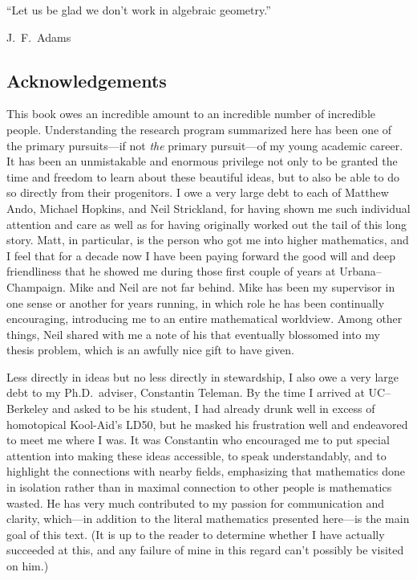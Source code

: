 
% 

\newpage

\vspace*{\fill}

\epigraph{``Let us be glad we don't work in algebraic geometry.''}{J.\ F.\ Adams~\cite[Section 2.1]{AdamsInfiniteLoopSpaces}}

\newpage

\subsection*{Acknowledgements}


This book owes an incredible amount to an incredible number of incredible people.  Understanding the research program summarized here has been one of the primary pursuits---if not \emph{the} primary pursuit---of my young academic career.  It has been an unmistakable and enormous privilege not only to be granted the time and freedom to learn about these beautiful ideas, but to also be able to do so directly from their progenitors.  I owe a very large debt to each of Matthew Ando, Michael Hopkins, and Neil Strickland, for having shown me such individual attention and care as well as for having originally worked out the tail of this long story.  Matt, in particular, is the person who got me into higher mathematics, and I feel that for a decade now I have been paying forward the good will and deep friendliness that he showed me during those first couple of years at Urbana--Champaign.  Mike and Neil are not far behind.  Mike has been my supervisor in one sense or another for years running, in which role he has been continually encouraging, introducing me to an entire mathematical worldview.  Among other things, Neil shared with me a note of his that eventually blossomed into my thesis problem, which is an awfully nice gift to have given.

Less directly in ideas but no less directly in stewardship, I also owe a very large debt to my Ph.D.\ adviser, Constantin Teleman.  By the time I arrived at UC--Berkeley and asked to be his student, I had already drunk well in excess of homotopical Kool-Aid's LD50, but he masked his frustration well and endeavored to meet me where I was.  It was Constantin who encouraged me to put special attention into making these ideas accessible, to speak understandably, and to highlight the connections with nearby fields, emphasizing that mathematics done in isolation rather than in maximal connection to other people is mathematics wasted.  He has very much contributed to my passion for communication and clarity, which---in addition to the literal mathematics presented here---is the main goal of this text.  (It is up to the reader to determine whether I have actually succeeded at this, and any failure of mine in this regard can't possibly be visited on him.)

